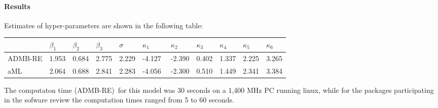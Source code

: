 \documentclass{article}
\begin{document}
\paragraph{Results}

Estimates of hyper-parameters are shown in the following table:

\begin{center}
\begin{tabular}{lllllllllll}
& $\beta _{1}$ & $\beta _{2}$ & $\beta _{3}$ & $\sigma $ & $\kappa
_{1}\qquad $ & $\kappa _{2}$ & $\kappa _{3}$ & $\kappa _{4}$ & $\kappa _{5}$
& $\kappa _{6}$ \\ \hline
ADMB-RE & 1.953 & 0.684 & 2.775 & 2.229 & -4.127 & -2.390 & 0.402 & 1.337 & 
2.225 & 3.265 \\ 
aML & 2.064 & 0.688 & 2.841 & 2.283 & -4.056 & -2.300 & 0.510 & 1.449 & 2.341
& 3.384%
\end{tabular}
\end{center}

The computaton time (ADMB-RE)\ for this model was 30 seconds on a 1,400 MHz
PC running linux, while for the packages participating in the sofware review
the computation times ranged from 5 to 60 seconds.
\end{document}
